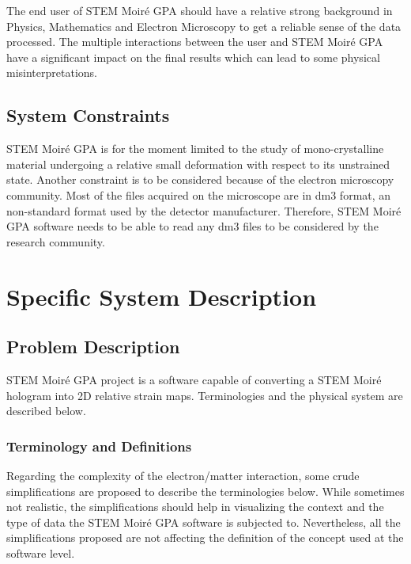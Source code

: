 \documentclass[12pt]{article}
\newcommand{\progname}{STEM Moir{\'e} GPA}
\begin{document}
The end user of \progname{} should have a relative strong background in Physics, Mathematics and Electron Microscopy to get a reliable sense of the data processed. The multiple interactions between the user and \progname{} have a significant impact on the final results which can lead to some physical misinterpretations. 

\subsection{System Constraints}

\progname{} is for the moment limited to the study of mono-crystalline material undergoing a relative small deformation with respect to its unstrained state. Another constraint is to be considered because of the electron microscopy community. Most of the files acquired on the microscope are in dm3 format, an non-standard format used by the detector manufacturer. Therefore, \progname{} software needs to be able to read any dm3 files to be considered by the research community.

\section{Specific System Description}
\subsection{Problem Description} \label{Sec_pd}

STEM Moir{\'e} GPA project is a software capable of converting a STEM Moir{\'e} 
hologram into 2D relative strain maps. Terminologies and the physical system are described below.

\subsubsection{Terminology and Definitions}

Regarding the complexity of the electron/matter interaction, some crude 
simplifications are proposed to describe the terminologies below. While 
sometimes not realistic, the simplifications should help in visualizing the 
context and the type of data the STEM Moir{\'e} GPA software is subjected to. Nevertheless, all the simplifications proposed are not affecting the definition of the concept used at the software level.
\end{document}
